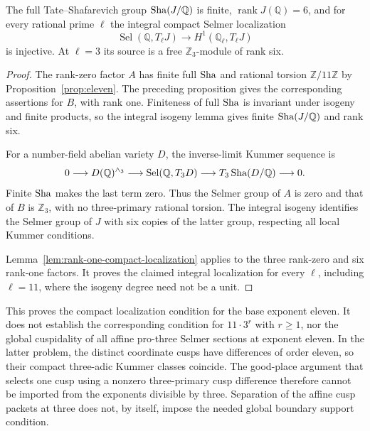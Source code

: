\begin{theorem}
\label{thm:eleven-compact-selmer}
The full Tate--Shafarevich group $\operatorname{Sha}(J/\mathbb Q)$ is finite,
$\operatorname{rank}J(\mathbb Q)=6$, and for every rational prime
$\ell$ the integral compact Selmer localization
\[
 \operatorname{Sel}(\mathbb Q,T_\ell J)
             \longrightarrow H^1(\mathbb Q_\ell,T_\ell J)
\]
is injective. At $\ell=3$ its source is a free $\mathbb Z_3$-module
of rank six.
\end{theorem}
\begin{proof}
The rank-zero factor $A$ has finite full $\operatorname{Sha}$ and rational
torsion $\mathbb Z/11\mathbb Z$ by Proposition~\ref{prop:eleven}.
The preceding proposition gives the corresponding assertions for
$B$, with rank one.  Finiteness of full $\operatorname{Sha}$ is invariant under
isogeny and finite products, so the integral isogeny lemma gives
finite $\operatorname{Sha}(J/\mathbb Q)$ and rank six.

For a number-field abelian variety $D$, the inverse-limit Kummer
sequence is
\[
 0\longrightarrow D(\mathbb Q)^{\wedge_3}
 \longrightarrow\operatorname{Sel}(\mathbb Q,T_3D)
 \longrightarrow T_3\operatorname{Sha}(D/\mathbb Q)\longrightarrow0.
\]
Finite $\operatorname{Sha}$ makes the last term zero.  Thus the Selmer group of
$A$ is zero and that of $B$ is $\mathbb Z_3$, with no three-primary
rational torsion.  The integral isogeny identifies the Selmer group
of $J$ with six copies of the latter group, respecting all local
Kummer conditions.

Lemma~\ref{lem:rank-one-compact-localization} applies to the
three rank-zero and six rank-one factors. It proves the claimed
integral localization for every $\ell$, including $\ell=11$,
where the isogeny degree need not be a unit.
\end{proof}

\begin{remark}
\label{rem:eleven-compact-scope}
This proves the compact localization condition for the base exponent
eleven.  It does not establish the corresponding condition for
$11\cdot3^r$ with $r\ge1$, nor the global cuspidality of all affine
pro-three Selmer sections at exponent eleven.  In the latter problem,
the distinct coordinate cusps have differences of order eleven, so
their compact three-adic Kummer classes coincide.  The good-place
argument that selects one cusp using a nonzero three-primary cusp
difference therefore cannot be imported from the exponents divisible
by three.  Separation of the affine cusp packets at three does not,
by itself, impose the needed global boundary support condition.
\end{remark}
